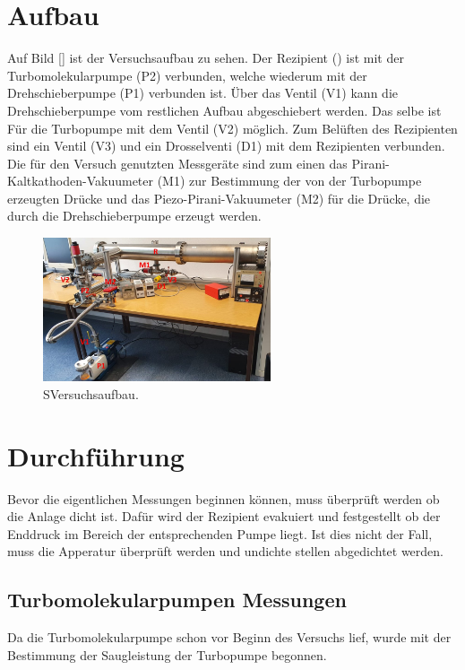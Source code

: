 \section{Aufbau}
\label{sec:Aufbau}
Auf Bild \ref{} ist der Versuchsaufbau zu sehen. Der Rezipient () ist mit der Turbomolekularpumpe (P2) verbunden, 
welche wiederum mit der Drehschieberpumpe (P1) verbunden ist. Über das Ventil (V1) kann die Drehschieberpumpe vom 
restlichen Aufbau abgeschiebert werden. Das selbe ist Für die Turbopumpe mit dem Ventil (V2) möglich.
Zum Belüften des Rezipienten sind ein Ventil (V3) und ein Drosselventi (D1) mit dem Rezipienten verbunden.
Die für den Versuch genutzten Messgeräte sind zum einen das Pirani-Kaltkathoden-Vakuumeter (M1) zur Bestimmung der 
von der Turbopumpe erzeugten Drücke und das Piezo-Pirani-Vakuumeter (M2) für die Drücke, die durch die Drehschieberpumpe 
erzeugt werden.

    \begin{figure}
        \centering
        \caption{SVersuchsaufbau.}
        \label{fig:Versuchsaufbau}
        \includegraphics[width=0.6\textwidth]{Versuchsaufbau_V70.jpeg}
    \end{figure}


\section{Durchführung}
\label{sec:Durchführung}
Bevor die eigentlichen Messungen beginnen können, muss überprüft werden ob die Anlage dicht ist.
Dafür wird der Rezipient evakuiert und festgestellt ob der Enddruck im Bereich der entsprechenden Pumpe liegt. 
Ist dies nicht der Fall, muss die Apperatur überprüft werden und undichte stellen abgedichtet werden.

\subsection{Turbomolekularpumpen Messungen}
\label{sec:Turbomolekularpumpen Messungen}
Da die Turbomolekularpumpe schon vor Beginn des Versuchs lief, wurde mit der Bestimmung der Saugleistung der Turbopumpe begonnen.

